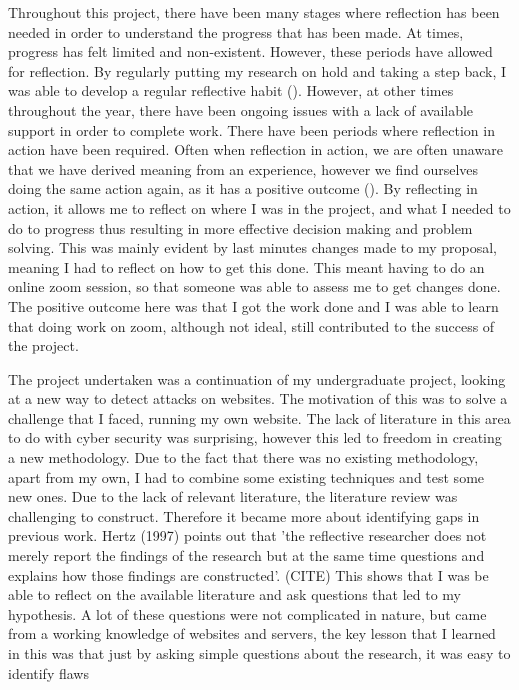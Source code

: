 

Throughout this project, there have been many stages where reflection has been needed in order to understand the progress that has been made. At times, progress has felt limited and non-existent. However, these periods have allowed for reflection. By regularly putting my research on hold and taking a step back, I was able to develop a regular reflective habit  (\cite{dyment2010quality}). However, at other times throughout the year, there have been ongoing issues with a lack of available support in order to complete work. There have been periods where reflection in action have been required. Often when reflection in action, we are often unaware that we have derived meaning from an experience, however we find ourselves doing the same action again, as it has a positive outcome (\cite{Schon83}). By reflecting in action, it allows me to reflect on where I was in the project, and what I needed to do to progress thus resulting in more effective decision making and problem solving. This was mainly evident by last minutes changes made to my proposal, meaning I had to reflect on how to get this done. This meant having to do an online zoom session, so that someone was able to assess me to get changes done. The positive outcome here was that I got the work done and I was able to learn that doing work on zoom, although not ideal, still contributed to the success of the project.


The project undertaken was a continuation of my undergraduate project, looking at a new way to detect attacks on websites. The motivation of this was to solve a challenge that I faced, running my own website. The lack of literature in this area to do with cyber security was surprising, however this led to freedom in creating a new methodology. Due to the fact that there was no existing methodology, apart from my own, I had to combine some existing techniques and test some new ones. Due to the lack of relevant literature, the literature review was challenging to construct. Therefore it became more about identifying gaps in previous work. Hertz (1997) points out that 'the reflective researcher does not merely report the findings of the research but at the same time questions and explains how those findings are constructed'. (CITE) This shows that I was be able to reflect on the available literature and ask questions that led to my hypothesis. A lot of these questions were not complicated in nature, but came from a working knowledge of websites and servers, the key lesson that I learned in this was that just by asking simple questions about the research, it was easy to identify flaws 

